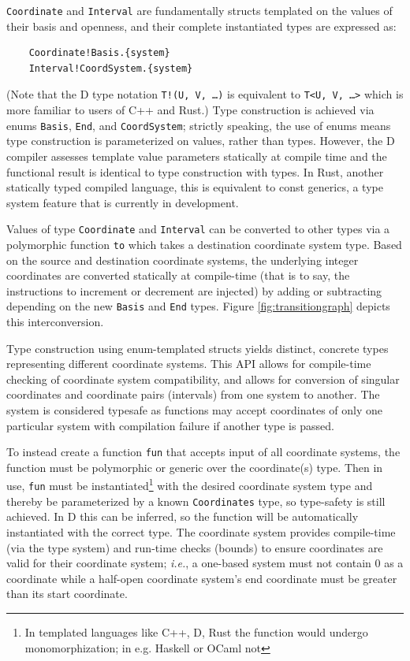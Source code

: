 \documentclass[12pt]{article}
\begin{document}
\texttt{Coordinate} and \texttt{Interval} are fundamentally structs templated on the values of their basis and openness, and their complete instantiated types are expressed as:

\begin{verbatim}
    Coordinate!Basis.{system}
    Interval!CoordSystem.{system}
\end{verbatim}

(Note that the D type notation \texttt{T!(U, V, \ldots)} is equivalent to \texttt{T<U, V, \ldots>} which is more familiar to users of C++ and Rust.) Type construction is achieved via enums \texttt{Basis}, \texttt{End}, and \texttt{CoordSystem}; strictly speaking, the use of enums means type construction is parameterized on values, rather than types. However, the D compiler assesses template value parameters statically at compile time and the functional result is identical to type construction with types. In Rust, another statically typed compiled language, this is equivalent to const generics, a type system feature that is currently in development.

Values of type \texttt{Coordinate} and \texttt{Interval} can be converted to other types via a polymorphic function \texttt{to} which takes a destination coordinate system type. Based on the source and destination coordinate systems, the underlying integer coordinates are converted statically at compile-time (that is to say, the instructions to increment or decrement are injected) by adding or subtracting depending on the new \texttt{Basis} and \texttt{End} types. Figure \ref{fig:transitiongraph} depicts this interconversion.

Type construction using enum-templated structs yields distinct, concrete types representing different coordinate systems. This API allows for compile-time checking of coordinate system compatibility, and allows for conversion of singular coordinates and coordinate pairs (intervals) from one system to another. The system is considered typesafe as functions may accept coordinates of only one particular system with compilation failure if another type is passed. 

To instead create a function \texttt{fun} that accepts input of all coordinate systems, the function must be polymorphic or generic over the coordinate(s) type. Then in use, \texttt{fun} must be instantiated\footnote{In templated languages like C++, D, Rust the function would undergo monomorphization; in e.g. Haskell or OCaml not} with the desired coordinate system type and thereby be parameterized by a known \texttt{Coordinates} type, so type-safety is still achieved. In D this can be inferred, so the function will be automatically instantiated with the correct type. The coordinate system provides compile-time (via the type system) and run-time checks (bounds) to ensure coordinates are valid for their coordinate system; \textit{i.e.}, a one-based system must not contain 0 as a coordinate while a half-open coordinate system’s end coordinate must be greater than its start coordinate.
\end{document}
